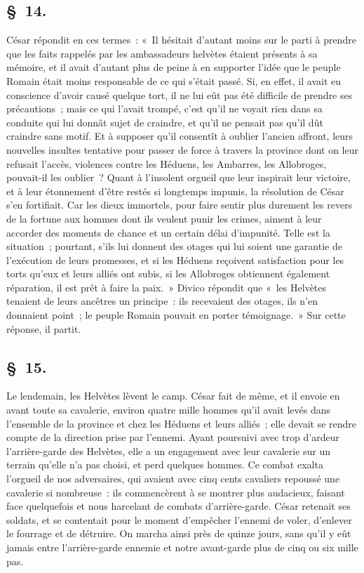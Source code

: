 \documentclass[french,twoside]{book} %
\begin{document}
\subsection[{§ 14.}]{ \textsc{§ 14.} }
\noindent César répondit en ces termes : « Il hésitait d’autant moins sur le parti à prendre que les faits rappelés par les ambassadeurs helvètes étaient présents à sa mémoire, et il avait d’autant plus de peine à en supporter l’idée que le peuple Romain était moins responsable de ce qui s’était passé. Si, en effet, il avait eu conscience d’avoir causé quelque tort, il ne lui eût pas été difficile de prendre ses précautions ; mais ce qui l’avait trompé, c’est qu’il ne voyait rien dans sa conduite qui lui donnât sujet de craindre, et qu’il ne pensait pas qu’il dût craindre sans motif. Et à supposer qu’il consentît à oublier l’ancien affront, leurs nouvelles insultes tentative pour passer de force à travers la province dont on leur refusait l’accès, violences contre les Héduens, les Ambarres, les Allobroges, pouvait-il les oublier ? Quant à l’insolent orgueil que leur inspirait leur victoire, et à leur étonnement d’être restés si longtemps impunis, la résolution de César s’en fortifiait. Car les dieux immortels, pour faire sentir plus durement les revers de la fortune aux hommes dont ils veulent punir les crimes, aiment à leur accorder des moments de chance et un certain délai d’impunité. Telle est la situation ; pourtant, s’ils lui donnent des otages qui lui soient une garantie de l’exécution de leurs promesses, et si les Héduens reçoivent satisfaction pour les torts qu’eux et leurs alliés ont subis, si les Allobroges obtiennent également réparation, il est prêt à faire la paix. » Divico répondit que « les Helvètes tenaient de leurs ancêtres un principe : ils recevaient des otages, ils n’en donnaient point ; le peuple Romain pouvait en porter témoignage. » Sur cette réponse, il partit.
\subsection[{§ 15.}]{ \textsc{§ 15.} }
\noindent Le lendemain, les Helvètes lèvent le camp. César fait de même, et il envoie en avant toute sa cavalerie, environ quatre mille hommes qu’il avait levés dans l’ensemble de la province et chez les Héduens et leurs alliés ; elle devait se rendre compte de la direction prise par l’ennemi. Ayant poursuivi avec trop d’ardeur l’arrière-garde des Helvètes, elle a un engagement avec leur cavalerie sur un terrain qu’elle n’a pas choisi, et perd quelques hommes. Ce combat exalta l’orgueil de nos adversaires, qui avaient avec cinq cents cavaliers repoussé une cavalerie si nombreuse : ils commencèrent à se montrer plus audacieux, faisant face quelquefois et nous harcelant de combats d’arrière-garde. César retenait ses soldats, et se contentait pour le moment d’empêcher l’ennemi de voler, d’enlever le fourrage et de détruire. On marcha ainsi près de quinze jours, sans qu’il y eût jamais entre l’arrière-garde ennemie et notre avant-garde plus de cinq ou six mille pas.
\end{document}
